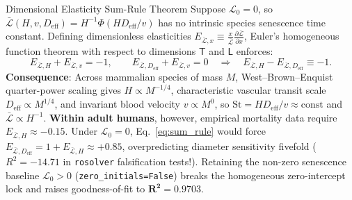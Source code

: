 \documentclass[11pt,a4paper]{article}
\newcommand{\pd}[2]{\frac{\partial #1}{\partial #2}}
\newcommand{\Lbar}{\bar{\mathcal{L}}}
\newcommand{\Deff}{D_{\mathrm{eff}}}
\newcommand{\St}{\mathrm{St}}
\begin{document}
\begin{insightbox}{Dimensional Elasticity Sum-Rule Theorem}
Suppose $\mathcal{L}_0 = 0$, so $\Lbar(H, v, \Deff) = H^{-1}\Phi(H\Deff/v)$ has no intrinsic species senescence time constant. Defining dimensionless elasticities $E_{\Lbar, x} \equiv \frac{x}{\Lbar}\pd{\Lbar}{x}$, Euler's homogeneous function theorem with respect to dimensions $\mathsf{T}$ and $\mathsf{L}$ enforces:
\begin{equation}
  E_{\Lbar, H} + E_{\Lbar, v} = -1, \qquad E_{\Lbar, \Deff} + E_{\Lbar, v} = 0
  \quad\Longrightarrow\quad
  E_{\Lbar, H} - E_{\Lbar, \Deff} \equiv -1.
  \label{eq:sum_rule}
\end{equation}
\textbf{Consequence}: Across mammalian species of mass $M$, West--Brown--Enquist quarter-power scaling gives $H \propto M^{-1/4}$, characteristic vascular transit scale $\Deff \propto M^{1/4}$, and invariant blood velocity $v \propto M^0$, so $\St = H\Deff/v \approx \text{const}$ and $\Lbar \propto H^{-1}$. \textbf{Within adult humans}, however, empirical mortality data require $E_{\Lbar, H} \approx -0.15$. Under $\mathcal{L}_0 = 0$, Eq.~\eqref{eq:sum_rule} would force $E_{\Lbar, \Deff} = 1 + E_{\Lbar, H} \approx +0.85$, overpredicting diameter sensitivity fivefold ($R^2 = -14.71$ in \texttt{rosolver} falsification tests!). Retaining the non-zero senescence baseline $\mathcal{L}_0 > 0$ (\texttt{zero\_initials=False}) breaks the homogeneous zero-intercept lock and raises goodness-of-fit to $\mathbf{R^2 = 0.9703}$.
\end{insightbox}
\end{document}
